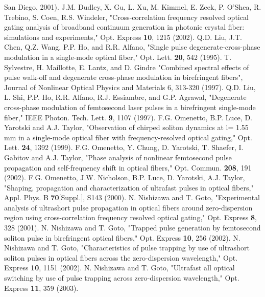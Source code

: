 \begin{thebibliography}{99}
San Diego, 2001).
 J.M. Dudley, X. Gu, L. Xu, M. Kimmel, E. Zeek, P. O'Shea, R. Trebino, S. Coen, R.S. Windeler, "Cross-correlation frequency resolved optical gating analysis of broadband continuum generation in photonic crystal fiber: simulations and experiments," Opt. Express \textbf{10}, 1215 (2002).
 Q.D. Liu, J.T. Chen, Q.Z. Wang, P.P. Ho, and R.R. Alfano, "Single pulse degenerate-cross-phase modulation in a single-mode optical fiber," Opt. Lett. \textbf{20}, 542 (1995).
 T. Sylvestre, H. Maillotte, E. Lantz, and D. Gindre "Combined spectral effects of pulse walk-off and degenerate cross-phase modulation in birefringent fibers", Journal of Nonlinear Optical Physics and Materials 6, 313-320 (1997).
 Q.D. Liu, L. Shi, P.P. Ho, R.R. Alfano, R.J. Essiambre, and G.P. Agrawal, "Degenerate cross-phase modulation of femtosecond laser pulses in a birefringent single-mode fiber," IEEE Photon. Tech. Lett. \textbf{9}, 1107 (1997). 
 F.G. Omenetto, B.P. Luce, D. Yarotski and A.J. Taylor, "Observation of chirped soliton dynamics at l= 1.55 mm in a single-mode optical fiber with frequency-resolved optical gating," Opt. Lett. \textbf{24}, 1392 (1999).
 F.G. Omenetto, Y. Chung, D. Yarotski, T. Shaefer, I. Gabitov and A.J. Taylor, "Phase analysis of nonlinear femtosecond pulse propagation and self-frequency shift in optical fibers," Opt. Commun. \textbf{208}, 191 (2002). 
 F.G. Omenetto, J.W. Nicholson, B.P. Luce, D. Yarotski, A.J. Taylor, "Shaping, propagation and characterization of ultrafast pulses in optical fibers," Appl. Phys. B \textbf{70}[Suppl.], S143 (2000).
 N. Nishizawa and T. Goto, "Experimental analysis of ultrashort pulse propagation in optical fibers around zero-dispersion region using cross-correlation frequency resolved optical gating," Opt. Express \textbf{8}, 328 (2001).
 N. Nishizawa and T. Goto, "Trapped pulse generation by femtosecond soliton pulse in birefringent optical fibers," Opt. Express \textbf{10}, 256 (2002).
 N. Nishizawa and T. Goto, "Characteristics of pulse trapping by use of ultrashort soliton pulses in optical fibers across the zero-dispersion wavelength," Opt. Express \textbf{10}, 1151 (2002).
 N. Nishizawa and T. Goto, "Ultrafast all optical switching by use of pulse trapping across zero-dispersion wavelength," Opt. Express \textbf{11}, 359 (2003).

\end{thebibliography}
